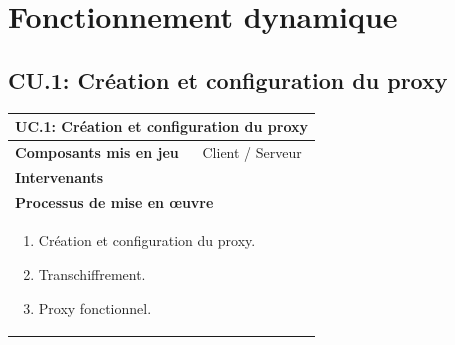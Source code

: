 \documentclass[a4paper,11pt,french]{article}
\begin{document}
\section{Fonctionnement dynamique}
\subsection{CU.1: Création et configuration du proxy}
\begin{center}
        \vspace*{0.7cm}
        \begin{tabularx}{16cm}{|l|X|}
        \hline
        \multicolumn{2}{|l|}{\textbf{UC.1: Création et configuration du proxy}}\\
        \hline
        \textbf{Composants mis en jeu} & Client / Serveur\\
        \hline
        \textbf{Intervenants} & \\
        \hline
        \multicolumn{2}{|l|}{\textbf{Processus de mise en \oe uvre}}\\
        \hline
        \multicolumn{2}{|p{15cm}|}{\begin{enumerate}\item Création et configuration du proxy. \item Transchiffrement. \item Proxy fonctionnel.\end{enumerate}}\\ 
        \hline
        \end{tabularx}
\end{center}


\vspace{2cm}
\end{document}
